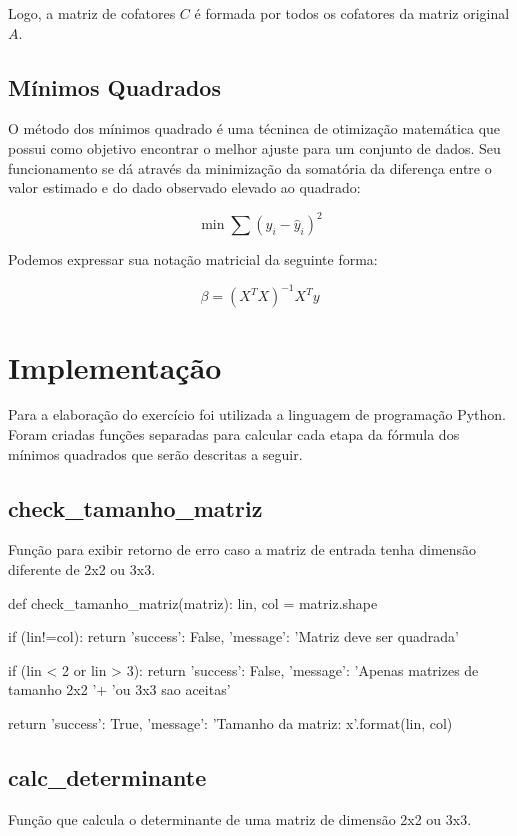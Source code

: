 \documentclass[a4paper, 11pt]{article}
\begin{document}
Logo, a matriz de cofatores $ C $ é formada por todos os cofatores da matriz original $ A $.

\subsection*{Mínimos Quadrados}
O método dos mínimos quadrado é uma técninca de otimização matemática que possui como objetivo encontrar o melhor ajuste para um conjunto de dados. Seu funcionamento se dá através da minimização da somatória da diferença entre o valor estimado e do dado observado elevado ao quadrado:

$$ \min{ \sum(y_i - \hat{y}_i)^2 } $$

Podemos expressar sua notação matricial da seguinte forma:

$$ \beta = (X^T X)^{-1} X^Ty $$

\section*{Implementação}
Para a elaboração do exercício foi utilizada a linguagem de programação Python.
Foram criadas funções separadas para calcular cada etapa da fórmula dos mínimos quadrados que serão descritas a seguir.

\subsection*{check\_tamanho\_matriz}
Função para exibir retorno de erro caso a matriz de entrada tenha dimensão diferente de 2x2 ou 3x3.

\begin{python}[language=Python]
def check_tamanho_matriz(matriz):
    lin, col = matriz.shape
    
    if (lin!=col): 
        return { 
            'success': False, 
            'message': 'Matriz deve ser quadrada'
        }
    
    if (lin < 2 or lin > 3):
        return {
            'success': False, 
            'message': 'Apenas matrizes de tamanho 2x2 '+
                       'ou 3x3 sao aceitas'
        }
    
    return{
        'success': True, 
        'message': 'Tamanho da matriz: {}x{}'.format(lin, col)
    }
\end{python}

\newpage
\subsection*{calc\_determinante}
Função que calcula o determinante de uma matriz de dimensão 2x2 ou 3x3.
\end{document}

